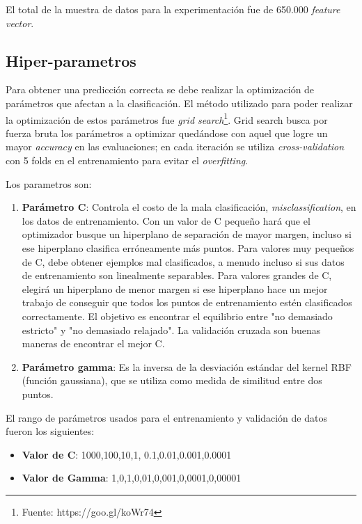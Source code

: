 El total de la muestra de datos para la experimentación fue de 650.000 \textit{feature vector}.

\subsection{Hiper-parametros}\label{sub:hiperparametro}


Para obtener una predicción correcta se debe realizar la optimización de parámetros que afectan a la clasificación. El método utilizado para poder realizar la optimización de estos parámetros fue \textit{grid search}\footnote{Fuente: https://goo.gl/koWr74}.  Grid search busca por fuerza bruta los parámetros a optimizar quedándose con aquel que logre un mayor \textit{accuracy} en las evaluaciones; en cada iteración se utiliza \textit{cross-validation} con 5 folds en el entrenamiento para evitar el \textit{overfitting}.

Los parametros son:
\begin{enumerate}
	\item \textbf{Parámetro C}: Controla el costo de la mala clasificación, \textit{misclassification}, en los datos de entrenamiento. Con un valor de C pequeño hará que el optimizador busque un hiperplano de separación de mayor margen, incluso si ese hiperplano clasifica erróneamente más puntos. Para valores muy pequeños de C, debe obtener ejemplos mal clasificados, a menudo incluso si sus datos de entrenamiento son linealmente separables. Para valores grandes de C,  elegirá un hiperplano de menor margen si ese hiperplano hace un mejor trabajo de conseguir que todos los puntos de entrenamiento estén clasificados correctamente. El objetivo es encontrar el equilibrio entre "no demasiado estricto" y "no demasiado relajado". La validación cruzada  son buenas maneras de encontrar el mejor C.
	\item \textbf{Parámetro gamma}: Es la inversa de la desviación estándar del kernel RBF (función gaussiana), que se utiliza como medida de similitud entre dos puntos.
\end{enumerate}
	

El rango de parámetros usados para el entrenamiento y validación de datos fueron los siguientes:

\begin{itemize}
 \item \textbf{Valor de C}: 1000,100,10,1, 0.1,0.01,0.001,0.0001
 \item \textbf{Valor de Gamma}: 1,0,1,0,01,0,001,0,0001,0,00001
\end{itemize}




